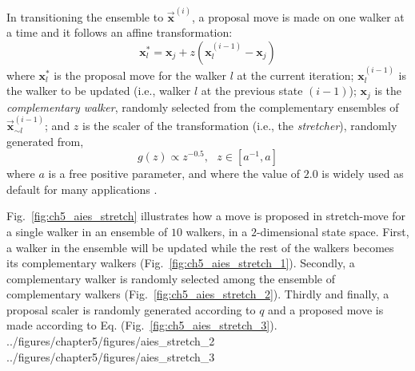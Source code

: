 In transitioning the ensemble to $\vec{\bm{x}}^{(i)}$,
a proposal move is made on one walker at a time and it follows an affine transformation:
\begin{equation}
	\bm{x}_l^* = \bm{x}_j + z (\bm{x}_l^{(i-1)} - \bm{x}_j)
\label{eq:ch5_proposal_move_stretch_move}
\end{equation}
where $\bm{x}_l^*$ is the proposal move for the walker $l$ at the current iteration;
$\bm{x}_l^{(i-1)}$ is the walker to be updated (i.e., walker $l$ at the previous state $(i-1)$);
$\bm{x}_j$ is the \emph{complementary walker}, randomly selected from the complementary ensembles of $\vec{\bm{x}}^{(i-1)}_{\sim l}$;
and $z$ is the scaler of the transformation (i.e., the \emph{stretcher}), randomly generated from,
\begin{equation}
	g(z) \propto z^{-0.5}, \,\,\,\, z \in [a^{-1}, a]
\label{eq:ch5_scaler_distribution}
\end{equation}
where $a$ is a free positive parameter,
and where the value of $2.0$ is widely used as default for many applications \cite{Goodman2010,Hou2012,Allison2013,Foreman-Mackey2013,Akeret2013}.

Fig.~\ref{fig:ch5_aies_stretch} illustrates how a move is proposed in stretch-move for a single walker in an ensemble of $10$ walkers, in a $2$-dimensional state space.
First, a walker in the ensemble will be updated while the rest of the walkers becomes its complementary walkers (Fig.~\ref{fig:ch5_aies_stretch_1}).
Secondly, a complementary walker is randomly selected among the ensemble of complementary walkers (Fig.~\ref{fig:ch5_aies_stretch_2}).
Thirdly and finally,
a proposal scaler is randomly generated according to $q$ and a proposed move is made according to Eq. (Fig.~\ref{fig:ch5_aies_stretch_3}).
{../figures/chapter5/figures/aies_stretch_2}
{../figures/chapter5/figures/aies_stretch_3}

